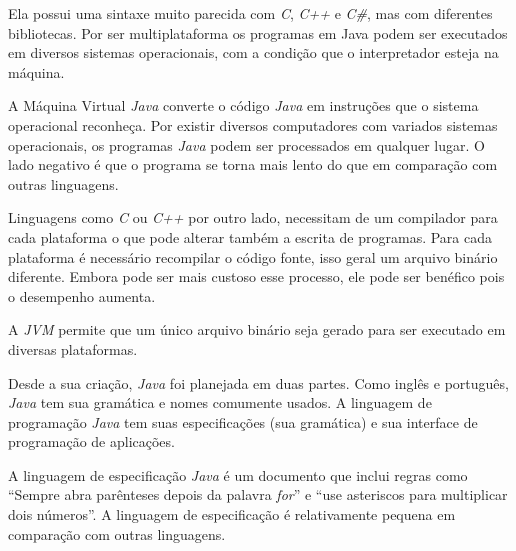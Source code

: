 \documentclass[conference]{IEEEtran}
\begin{document}
Ela possui uma sintaxe muito parecida com \textit{C}, \textit{C++} e \textit{C\#}, mas com diferentes bibliotecas. Por ser multiplataforma os programas em Java podem ser executados em diversos sistemas operacionais, com a condição que o interpretador esteja na máquina.

A Máquina Virtual \textit{Java} converte o código \textit{Java} em instruções que o sistema operacional reconheça. Por existir diversos computadores com variados sistemas operacionais, os programas \textit{Java} podem ser processados em qualquer lugar. O lado negativo é que o programa se torna mais lento do que em comparação com outras linguagens.

Linguagens como \textit{C} ou \textit{C++} por outro lado, necessitam de um compilador para cada plataforma o que pode alterar também a escrita de programas. Para cada plataforma é necessário recompilar o código fonte, isso geral um arquivo binário diferente. Embora pode ser mais custoso esse processo, ele pode ser benéfico pois o desempenho aumenta.

A \textit{JVM} permite que um único arquivo binário seja gerado para ser executado em diversas plataformas. 

Desde a sua criação, \textit{Java} foi planejada em duas partes. Como inglês e português, \textit{Java} tem sua gramática e nomes comumente usados. A linguagem de programação \textit{Java} tem suas especificações (sua gramática) e sua interface de programação de aplicações. 

A linguagem de especificação \textit{Java} é um documento que inclui regras como “Sempre abra parênteses depois da palavra \textit{for}” e “use asteriscos para multiplicar dois números”. A linguagem de especificação é relativamente pequena em comparação com outras linguagens.
\end{document}
